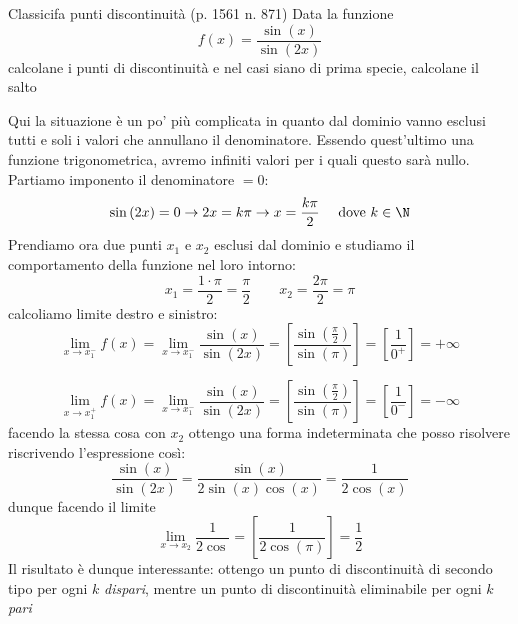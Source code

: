 \begin{esercizio}{Classicifa punti discontinuità (p. 1561 n. 871)}
	Data la funzione
	\[
		f\left(x\right) = \frac{\sin \left(x\right)}{\sin \left(2x\right)}
	\]
	calcolane i punti di discontinuità e nel casi siano di prima specie, calcolane il salto
\end{esercizio}
Qui la situazione è un po' più complicata in quanto dal dominio vanno esclusi tutti e soli i valori che annullano il denominatore. Essendo quest'ultimo una funzione trigonometrica, avremo infiniti valori per i quali questo sarà nullo. Partiamo imponento il denominatore $ = 0 $:
\[
	\sin \left(2x\right) = 0 \rightarrow 2x = k \pi \rightarrow x = \frac{k \pi }{2} \quad \text{ dove }  k  \in \N
\]
Prendiamo ora due punti $ x_1 $ e $ x_2 $ esclusi dal dominio e studiamo il comportamento della funzione nel loro intorno:
\[
	x_1 = \frac{1 \cdot  \pi }{2} = \frac{\pi}{2} \quad \quad x_2 = \frac{2 \pi }{2} = \pi
\]
calcoliamo limite destro e sinistro:
\[
	\lim_{x \to x_1^{-}} f(x) = \lim_{x \to x_1^{-}} \frac{\sin \left(x\right)}{\sin \left(2x\right)} = \left[ \frac{\sin \left( \frac{\pi }{2}\right)}{ \sin \left(\pi \right)} \right] = \left[\frac{1}{0^{+}}\right] = +\infty
\]

\[
	\lim_{x \to x_1^{+}} f(x) = \lim_{x \to x_1^{-}} \frac{\sin \left(x\right)}{\sin \left(2x\right)} = \left[ \frac{\sin \left( \frac{\pi }{2}\right)}{ \sin \left(\pi \right)} \right] = \left[\frac{1}{0^{-}}\right] = -\infty
\]
facendo la stessa cosa con $ x_2 $ ottengo una forma indeterminata che posso risolvere riscrivendo l'espressione così:
\[
	\frac{\sin \left(x\right)}{\sin \left(2x\right)}  = \frac{\sin \left(x\right)}{2 \sin \left(x\right) \cos \left(x\right)} = \frac{1}{2 \cos\left(x\right)}
\]
dunque facendo il limite
\[
	\lim_{x \to x_2}  \frac{1}{2 \cos }  = \left[ \frac{1}{2 \cos \left(\pi \right)}\right] = \frac{1}{2}
\]
\vskip3mm
Il risultato è dunque interessante: ottengo un punto di discontinuità di secondo tipo per ogni $ k $ \textit{dispari}, mentre un punto di discontinuità eliminabile per ogni $ k $ \textit{pari}


